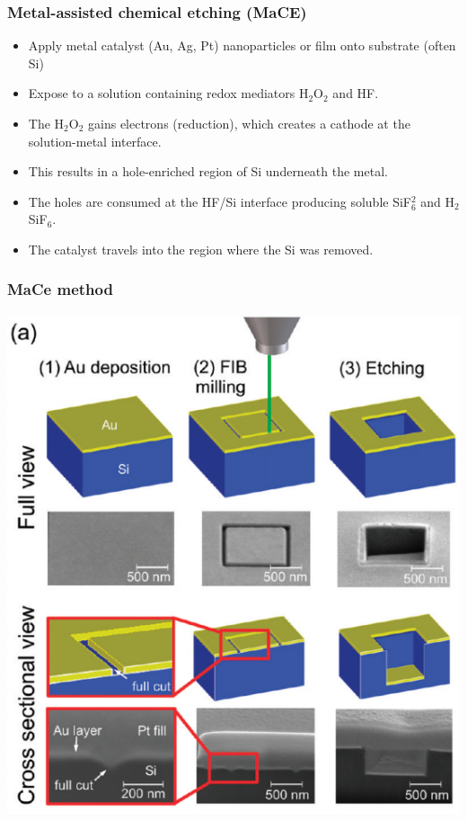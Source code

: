 \documentclass{beamer}
\begin{document}
\begin{frame}\frametitle{Metal-assisted chemical etching (MaCE)}
	\begin{itemize}
	    \item Apply metal catalyst (Au, Ag, Pt) nanoparticles or film onto substrate (often Si)
	    \item Expose to a solution containing redox mediators H$_2$O$_2$ and HF.
	    \item The H$_2$O$_2$ gains electrons (reduction), which creates a cathode at the solution-metal interface.
	    \item This results in a hole-enriched region of Si underneath the metal.
	    \item The holes are consumed at the HF/Si interface producing soluble SiF$_6^2$ and H$_2$SiF$_6$.
	    \item The catalyst travels into the region where the Si was removed.
	\end{itemize}
\end{frame}

\begin{frame}\frametitle{MaCe method}
    \centering
    \begin{minipage}{0.5\textwidth}
		\includegraphics[width=\textwidth]{images/fig1.png}
	\end{minipage}
\end{frame}
\end{document}
